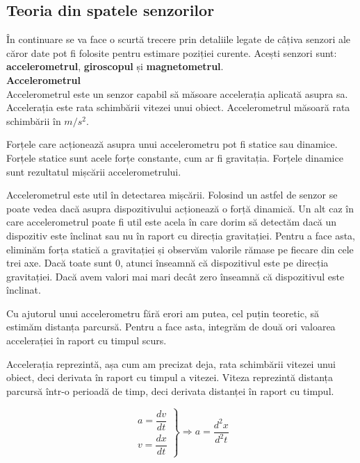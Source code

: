 \documentclass[12pt, a4paper, oneside]{article}
\begin{document}
\newpage
\subsection{Teoria din spatele senzorilor}
În continuare se va face o scurtă trecere prin detaliile legate de câțiva senzori ale căror date pot fi folosite pentru estimare poziției curente. Acești senzori sunt: \textbf{accelerometrul}, \textbf{giroscopul} și \textbf{magnetometrul}.\\

\textbf{Accelerometrul}\\
Accelerometrul este un senzor capabil să măsoare accelerația aplicată asupra sa. Accelerația este rata schimbării vitezei unui obiect. Accelerometrul măsoară rata schimbării în $m/s^{2}$.

Forțele care acționează asupra unui accelerometru pot fi statice sau dinamice. Forțele statice sunt acele forțe constante, cum ar fi gravitația. Forțele dinamice sunt rezultatul mișcării accelerometrului.

Accelerometrul este util în detectarea mișcării. Folosind un astfel de senzor se poate vedea dacă asupra dispozitivului acționează o forță dinamică. Un alt caz în care accelerometrul poate fi util este acela în care dorim să detectăm dacă un dispozitiv este înclinat sau nu în raport cu direcția gravitației. Pentru a face asta, eliminăm forța statică a gravitației și observăm valorile rămase pe fiecare din cele trei axe. Dacă toate sunt 0, atunci înseamnă că dispozitivul este pe direcția gravitației. Dacă avem valori mai mari decât zero înseamnă că dispozitivul este înclinat.

Cu ajutorul unui accelerometru fără erori am putea, cel puțin teoretic, să estimăm distanța parcursă. Pentru a face asta, integrăm de două ori valoarea accelerației în raport cu timpul scurs.

Accelerația reprezintă, așa cum am precizat deja, rata schimbării vitezei unui obiect, deci derivata în raport cu timpul a vitezei. Viteza reprezintă distanța parcursă într-o perioadă de timp, deci derivata distanței în raport cu timpul.

\begin{equation} 
\left.
\begin{aligned} a = \dfrac{dv}{dt}\\ v = \dfrac{dx}{dt} \end{aligned} \right\} \Rightarrow a = \dfrac{d^{2}x}{d^{2}t}
\end{equation}
\end{document}
